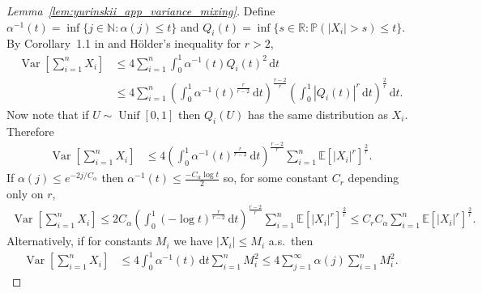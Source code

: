 \documentclass[11pt,lof]{puthesis}
\renewcommand{\P}{\ensuremath{\mathbb{P}}}
\newcommand{\N}{\ensuremath{\mathbb{N}}}
\newcommand{\R}{\ensuremath{\mathbb{R}}}
\newcommand{\E}{\ensuremath{\mathbb{E}}}
\DeclareMathOperator{\Var}{Var}
\DeclareMathOperator{\Unif}{Unif}
\newcommand{\diff}[1]{\,\mathrm{d}#1}
\theoremstyle{break}
\theoremstyle{proof}
\newtheorem{proof}{Proof}
\begin{document}
\begin{proof}[Lemma~\ref{lem:yurinskii_app_variance_mixing}]

  Define $\alpha^{-1}(t) =
  \inf\{j \in \N : \alpha(j) \leq t\}$
  and $Q_i(t) = \inf\{s \in \R : \P(|X_i| > s) \leq t\}$.
  By Corollary~1.1 in \citet{rio2017asymptotic}
  and H{\"o}lder's inequality for $r > 2$,
  \begin{align*}
    \Var\left[
      \sum_{i=1}^n X_i
    \right]
    &\leq
    4 \sum_{i=1}^n
    \int_0^1 \alpha^{-1}(t)
    Q_i(t)^2 \diff{t} \\
    &\leq
    4 \sum_{i=1}^n
    \left(
      \int_0^1 \alpha^{-1}(t)^{\frac{r}{r-2}} \diff{t}
    \right)^{\frac{r-2}{r}}
    \left(
      \int_0^1 |Q_i(t)|^r \diff{t}
    \right)^{\frac{2}{r}}
    \diff{t}.
  \end{align*}
  Now note that if $U \sim \Unif[0,1]$ then
  $Q_i(U)$ has the same distribution as $X_i$.
  Therefore
  \begin{align*}
    \Var\left[
      \sum_{i=1}^n X_i
    \right]
    &\leq
    4
    \left(
      \int_0^1 \alpha^{-1}(t)^{\frac r{r-2}} \diff{t}
    \right)^{\frac{r-2}r}
    \sum_{i=1}^n
    \E[|X_i|^r]^{\frac 2 r}.
  \end{align*}
  If $\alpha(j) \leq e^{-2j/C_\alpha}$ then
  $\alpha^{-1}(t) \leq \frac{-C_\alpha \log t}{2}$
  so, for some constant
  $C_r$ depending only on $r$,
  \begin{align*}
    \Var\left[
      \sum_{i=1}^n X_i
    \right]
    \leq
    2 C_\alpha
    \left(
      \int_0^1 (-\log t)^{\frac r{r-2}} \diff{t}
    \right)^{\frac{r-2} r}
    \sum_{i=1}^n
    \E[|X_i|^r]^{\frac 2 r}
    \leq
    C_r C_\alpha
    \sum_{i=1}^n
    \E[|X_i|^r]^{\frac 2 r}.
  \end{align*}
  Alternatively, if for constants $M_i$ we have
  $|X_i| \leq M_i$ a.s.\ then
  \begin{align*}
    \Var\left[
      \sum_{i=1}^n X_i
    \right]
    &\leq
    4 \int_0^1 \alpha^{-1}(t)
    \diff{t}
    \sum_{i=1}^n M_i^2
    \leq
    4 \sum_{j=1}^\infty \alpha(j)
    \sum_{i=1}^n M_i^2.
  \end{align*}
\end{proof}
\end{document}
